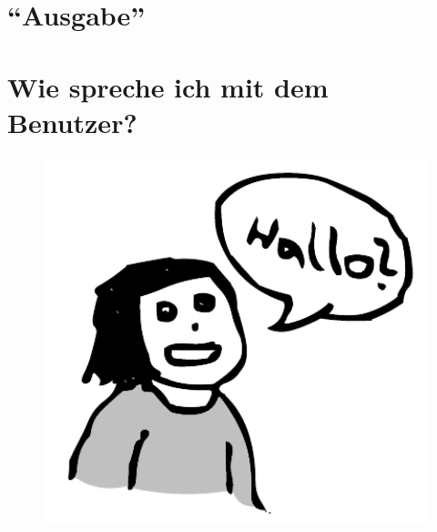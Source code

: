 



	\begin{center}
		\section*{\enquote{Ausgabe}}
		\section*{Wie spreche ich mit dem Benutzer?}	
	\end{center}

	\paragraph*{}
	\paragraph*{}
	
	\begin{figure}[htbp]
		\includegraphics[width=1\textwidth]{img/ausgabe.pdf}
		\label{ausgabe}
	\end{figure}
	
	\newpage
	
	
	\paragraph*{}
